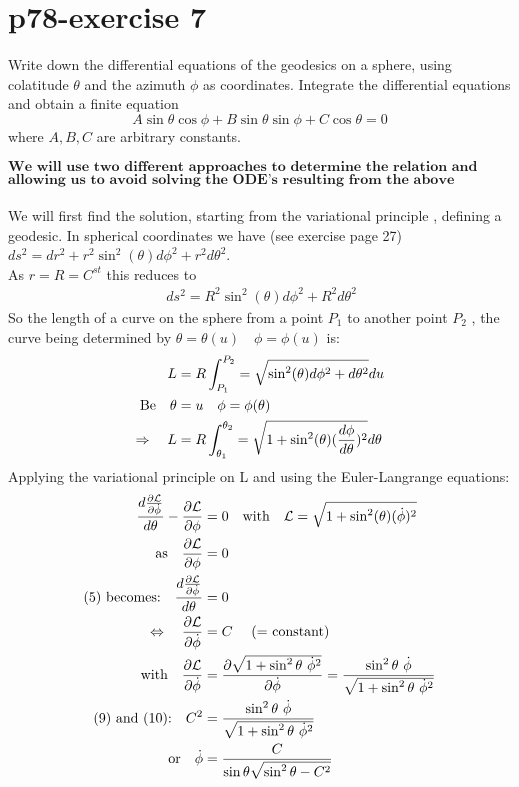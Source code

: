 \section{p78-exercise 7}
\begin{tcolorbox}
Write down the differential equations of the geodesics on a sphere, using colatitude $\theta$ and the azimuth $\phi$ as coordinates. Integrate the differential equations and obtain a finite equation $$ A\sin \theta \cos \phi + B \sin \theta \sin \phi + C\cos\theta = 0$$
where $A,B,C$ are arbitrary constants.
\end{tcolorbox}
$$\textbf{We will use two different approaches to determine the relation and finally use a geometrical reasoning }$$ $$\textbf{allowing us to avoid solving the ODE's resulting from the above mentioned approaches.}$$\\
We will first find the solution, starting from the variational principle , defining a geodesic.
In spherical coordinates we have (see exercise page 27) $ds^2 = dr^2 +  r^2\sin^2(\theta)d\phi^2+ r^2d\theta^2$.\\
As $r=R= C^{st}$ this reduces to
\begin{align}
\ ds^2 = R^2\sin^2(\theta)d\phi^2+ R^2d\theta^2
\end{align}
So the length of a curve on the sphere from a point $P_1$ to another point $P_2$ , the curve being determined by $\theta = \theta(u)\quad \phi = \phi(u)$ is:\\
\begin{align}
\ L &= R\int_{P_1}^{P_2} = \sqrt{\sin^2(\theta)d\phi^2+ d\theta^2}du\\
\text{Be}\quad \theta &= u \quad \phi = \phi(\theta)\\
\Rightarrow \quad  L &= R\int_{\theta_1}^{\theta_2} = \sqrt{1+\sin^2(\theta)(\dv{\phi}{\theta})^2}d\theta
\end{align}
Applying the variational principle on L and using the Euler-Langrange equations:
\begin{align}
 \dv{\pdv{\mathcal{L}}{\dot{\phi}}}{\theta} - \pdv{\mathcal{L}}{\phi}&=0 \quad 
 \text{with}\quad \mathcal{L} = \sqrt{1+\sin^2(\theta)(\dot{\phi})^2}\\
 \text{as}\quad  \pdv{\mathcal{L}}{\phi}&=0\\
 \text{(5) becomes:} \quad \dv{\pdv{\mathcal{L}}{\dot{\phi}}}{\theta} &=0\\
 \Leftrightarrow \quad \pdv{\mathcal{L}}{\dot{\phi}} &= C\quad \ \text{(= constant)}\\
\text{with}\quad \pdv{\mathcal{L}}{\dot{\phi}} &= \pdv{\sqrt{1+\sin^2 \theta   \  \dot{\phi}^2 }}{\dot{\phi}}= \frac{\sin^2 \theta \  \dot{\phi}}{ \sqrt{1+\sin^2 \theta \ \dot{\phi}^2 }}\\
\text{(9) and (10):}\quad C^2 &= \frac{\sin^2 \theta \  \dot{\phi}}{ \sqrt{1+\sin^2 \theta \ \dot{\phi}^2 }} \\
\text{or}\quad \dot{\phi} &= \frac{C}{\sin \theta \sqrt{\sin^2 \theta - C^2}}
\end{align}

